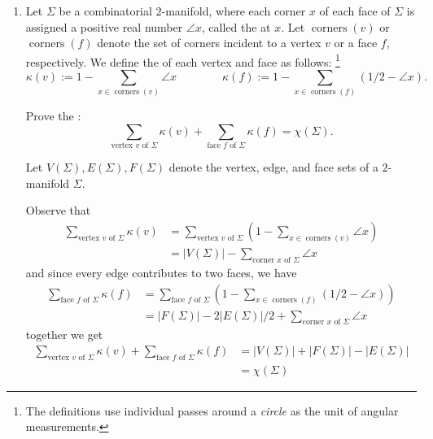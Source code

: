 \documentclass[11pt]{article}
\DeclareMathOperator{\corners}{corners}
\begin{document}
\begin{enumerate}
    \item
      Let \(\Sigma\) be a combinatorial \(2\)-manifold, where each corner \(x\) of each face of
      \(\Sigma\) is assigned a positive real number \(\angle x\), called the  at \(x\).
      Let \(\corners(v)\) or \(\corners(f)\) denote the set of corners incident to a vertex \(v\) or
      a face \(f\), respectively.
      We define the  of each vertex and face as follows:%
      \footnote{The definitions use individual passes around a \emph{circle} as the unit of angular
      measurements.}
      \[ \kappa(v) := 1 - \sum_{x \in \corners(v)} \angle x \qquad\qquad \kappa(f) := 1 - \sum_{x
      \in \corners(f)} (1/2 - \angle x).\]

      Prove the :
      \[ \sum_{\text{vertex \(v\) of \(\Sigma\)}} \kappa(v) + \sum_{\text{face \(f\) of \(\Sigma\)}}
        \kappa(f) = \chi(\Sigma). \]

      \begin{solution}
        Let \(V(\Sigma),E(\Sigma),F(\Sigma)\) denote the vertex, edge, and face sets of a \(2\)-manifold \(\Sigma\).

        Observe that
        \begin{align*}
          \sum_{\text{vertex \(v\) of \(\Sigma\)}} \kappa(v) &=  \sum_{\text{vertex \(v\) of \(\Sigma\)}} (1-\sum_{x\in\corners(v)} \angle x)\\
          &=|V(\Sigma)|-\sum_{\text{corner \(x\) of \(\Sigma\)}}\angle x
        \end{align*}
        and since every edge contributes to two faces, we have
        \begin{align*}
          \sum_{\text{face \(f\) of \(\Sigma\)}} \kappa(f) &= \sum_{\text{face \(f\) of \(\Sigma\)}}(1-\sum_{x\in\corners(f)}(1/2-\angle x))\\
          &=|F(\Sigma)|-2|E(\Sigma)|/2+\sum_{\text{corner \(x\) of \(\Sigma\)}}\angle x
        \end{align*}
        together we get
        \begin{align*}
          \sum_{\text{vertex \(v\) of \(\Sigma\)}} \kappa(v) + \sum_{\text{face \(f\) of \(\Sigma\)}} \kappa(f)&=|V(\Sigma)|+|F(\Sigma)|-|E(\Sigma)|\\
          &=\chi(\Sigma)
        \end{align*}
      \end{solution}


\end{enumerate}
\end{document}
